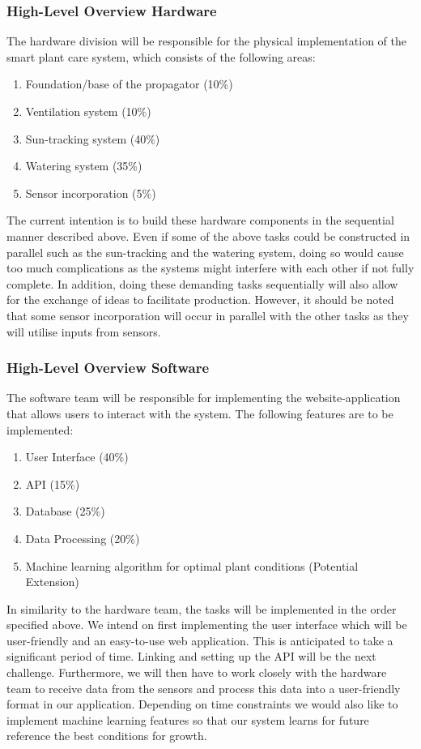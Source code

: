 \documentclass{article}
\begin{document}
\subsubsection{High-Level Overview Hardware}
The hardware division will be responsible for the physical implementation of the smart plant care system, which consists of the following areas:

\begin{enumerate}
    \item Foundation/base of the propagator (10\%)
    \item Ventilation system     (10\%)
    \item Sun-tracking system    (40\%)
    \item Watering system        (35\%)
    \item Sensor incorporation   (5\%)
\end{enumerate}

The current intention is to build these hardware components in the sequential manner described above. Even if some of the above tasks could be constructed in parallel such as the sun-tracking and the watering system, doing so would cause too much complications as the systems might interfere with each other if not fully complete. In addition, doing these demanding tasks sequentially will also allow for the exchange of ideas to facilitate production. However, it should be noted that some sensor incorporation will occur in parallel with the other tasks as they will utilise inputs from sensors.

\subsubsection{High-Level Overview Software}
The software team will be responsible for implementing the website-application that allows users to interact with the system. The following features are to be implemented:
\begin{enumerate}
    \item User Interface (40\%)
    \item API     (15\%)
    \item Database    (25\%)
    \item Data Processing        (20\%)
    \item Machine learning algorithm for optimal plant conditions (Potential Extension)
\end{enumerate}
In similarity to the hardware team, the tasks will be implemented in the order specified above. We intend on first implementing the user interface which will be user-friendly and an easy-to-use web application. This is anticipated to take a significant period of time. Linking and setting up the API will be the next challenge. Furthermore, we will then have to work closely with the hardware team to receive data from the sensors and process this data into a user-friendly format in our application. Depending on time constraints we would also like to implement machine learning features so that our system learns for future reference the best conditions for growth.
\end{document}
